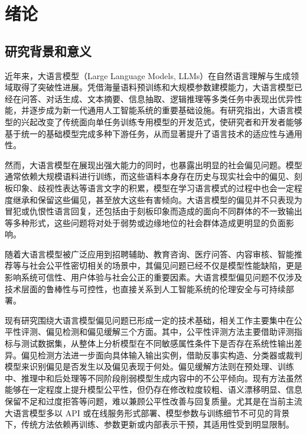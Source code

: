 \chapter{绪论}

\label{chap:intro}
\section{研究背景和意义}

近年来，大语言模型（Large Language Models, LLMs）在自然语言理解与生成领域取得了突破性进展。凭借海量语料预训练和大规模参数建模能力，大语言模型已经在问答、对话生成、文本摘要、信息抽取、逻辑推理等多类任务中表现出优异性能，并逐步成为新一代通用人工智能系统的重要基础设施\cite{DBLP:conf/nips/BrownMRSKDNSSAA20,DBLP:journals/corr/abs-2108-07258,DBLP:conf/nips/KojimaGRMI22}。有研究指出，大语言模型的兴起改变了传统面向单任务训练专用模型的开发范式，使研究者和开发者能够基于统一的基础模型完成多种下游任务，从而显著提升了语言技术的适应性与通用性\cite{DBLP:journals/coling/GallegosRBTKDYZA24}。

然而，大语言模型在展现出强大能力的同时，也暴露出明显的社会偏见问题。模型通常依赖大规模语料进行训练，而这些语料本身存在历史与现实社会中的偏见、刻板印象、歧视性表达等语言文字的积累，模型在学习语言模式的过程中也会一定程度继承和保留这些偏见，甚至放大这些有害倾向\cite{DBLP:conf/fat/BenderGMS21,DBLP:conf/emnlp/DodgeSMAIGM021,DBLP:conf/acl/ShengCNP20}。大语言模型的偏见并不只表现为冒犯或仇恨性语言回复，还包括由于刻板印象而造成的面向不同群体的不一致输出等多种形式\cite{DBLP:conf/fat/BenderGMS21, TSQB202608008}，这些问题将对处于弱势或边缘地位的社会群体造成更明显的负面影响。

随着大语言模型被广泛应用到招聘辅助、教育咨询、医疗问答、内容审核、智能推荐等与社会公平性密切相关的场景中，其偏见问题已经不仅是模型性能缺陷，更是影响系统可信性、用户体验与社会公正的重要因素。大语言模型偏见问题不仅涉及技术层面的鲁棒性与可控性，也直接关系到人工智能系统的伦理安全与可持续部署。

现有研究围绕大语言模型偏见问题已形成一定的技术基础，相关工作主要集中在公平性评测、偏见检测和偏见缓解三个方面。其中，公平性评测方法主要借助评测指标与测试数据集，从整体上分析模型在不同敏感属性条件下是否存在系统性输出差异。偏见检测方法进一步面向具体输入输出实例，借助反事实构造、分类器或裁判模型来识别偏见是否发生以及偏见表现于何处。偏见缓解方法则在预处理、训练中、推理中和后处理等不同阶段削弱模型生成内容中的不公平倾向。现有方法虽然能够在一定程度上提升模型公平性，但仍存在修改粒度较粗、语义漂移明显、信息保留不足和过度拒答等问题，难以兼顾公平性改善与回复质量。尤其是在当前主流大语言模型多以 API 或在线服务形式部署、模型参数与训练细节不可见的背景下，传统方法依赖再训练、参数更新或内部表示干预，其适用性受到明显限制。

